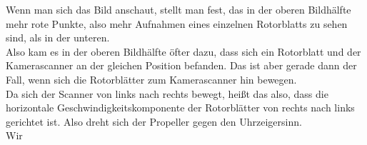 \begin{Answer}[ref = rollingshutter]
	\Question Wenn man sich das Bild anschaut, stellt man fest, das in der oberen Bildhälfte mehr rote Punkte, also mehr Aufnahmen eines einzelnen Rotorblatts zu sehen sind, als in der unteren.\\
	Also kam es in der oberen Bildhälfte öfter dazu, dass sich ein Rotorblatt und der Kamerascanner an der gleichen Position befanden. Das ist aber gerade dann der Fall, wenn sich die Rotorblätter zum Kamerascanner hin bewegen.\\
	Da sich der Scanner von links nach rechts bewegt, heißt das also, dass die horizontale Geschwindigkeitskomponente der Rotorblätter von rechts nach links gerichtet ist. Also dreht sich der Propeller gegen den Uhrzeigersinn.\\
	\Question Wir 
\end{Answer}

